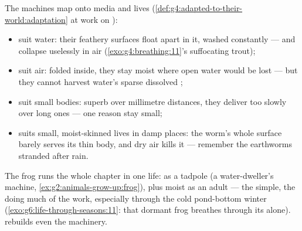 \begin{proposition}\label{prop:g7:how-animals-breathe:fits}
The machines map onto media and lives
(\cref{def:g4:adapted-to-their-world:adaptation} at work on
):
\begin{itemize}
  \item {} suit water: their feathery surfaces float
        apart in it, washed constantly --- and collapse
        uselessly in air (\cref{exo:g4:breathing:11}'s
        suffocating trout);
  \item {} suit air: folded inside, they stay moist
        where open water would be lost --- but they cannot
        harvest water's sparse dissolved ;
  \item {} suit small bodies: superb over millimetre
        distances, they deliver too slowly over long ones
        --- one reason  stay small;
  \item {} suits small, moist-skinned lives in
        damp places: the worm's whole surface barely
        serves its thin body, and dry air kills it ---
        remember the earthworms stranded after rain.
\end{itemize}
\end{proposition}
\admitted

\begin{example}\label{ex:g7:how-animals-breathe:frog}
The frog runs the whole chapter in one life:  as a
tadpole (a water-dweller's machine,
\cref{ex:g2:animals-grow-up:frog}),  plus moist 
as an adult --- the  simple, the  doing much of
the work, especially through the cold pond-bottom winter
(\cref{exo:g6:life-through-seasons:11}: that dormant frog
breathes through its  alone).  rebuilds
even the  machinery.
\end{example}

